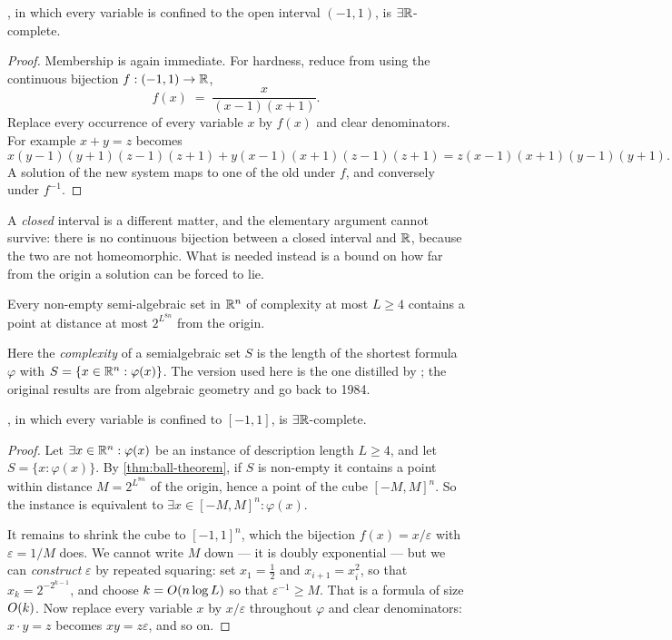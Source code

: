 \begin{lemma}\label{lem:bounded-etr}
, in which every variable is confined to the open interval
$(-1,1)$, is $\exists\mathbb{R}$-complete.
\end{lemma}

\begin{proof}
Membership is again immediate. For hardness, reduce from  using
the continuous bijection $f : (-1,1) \to \mathbb{R}$,
\[ f(x) \;=\; \frac{x}{(x-1)(x+1)}. \]
Replace every occurrence of every variable $x$ by $f(x)$ and clear
denominators. For example $x + y = z$ becomes
\[ x(y-1)(y+1)(z-1)(z+1) + y(x-1)(x+1)(z-1)(z+1)
   = z(x-1)(x+1)(y-1)(y+1). \]
A solution of the new system maps to one of the old under $f$, and conversely
under $f^{-1}$.
\end{proof}

A \emph{closed} interval is a different matter, and the elementary argument
cannot survive: there is no continuous bijection between a closed interval and
$\mathbb{R}$, because the two are not homeomorphic. What is needed instead is a bound on
how far from the origin a solution can be forced to lie.

\begin{theorem}\label{thm:ball-theorem}
Every non-empty semi-algebraic set in $\mathbb{R}^n$ of complexity at most $L \ge 4$
contains a
point at distance at most $2^{L^{8n}}$ from the origin.
\end{theorem}

Here the \emph{complexity} of a semialgebraic set $S$ is the length of the
shortest formula $\varphi$ with $S = \{x \in \mathbb{R}^n : \varphi(x)\}$. The version
used here is the one distilled by \citet{SchaeferStefankovic2017}; the original
results are from algebraic geometry and go back to 1984.

\begin{lemma}\label{lem:compact-etr}
, in which every variable is confined to $[-1,1]$, is
$\exists\mathbb{R}$-complete.
\end{lemma}

\begin{proof}
Let $\exists x \in \mathbb{R}^n : \varphi(x)$ be an  instance of
description length $L \ge 4$, and let $S = \{x : \varphi(x)\}$. By
\cref{thm:ball-theorem}, if $S$ is non-empty it contains a point within
distance $M = 2^{L^{8n}}$ of the origin, hence a point of the cube
$[-M,M]^n$. So the instance is equivalent to $\exists x \in [-M,M]^n :
\varphi(x)$.

It remains to shrink the cube to $[-1,1]^n$, which the bijection
$f(x) = x/\varepsilon$ with $\varepsilon = 1/M$ does. We cannot write $M$ down
--- it is doubly exponential --- but we can \emph{construct} $\varepsilon$ by
repeated squaring: set $x_1 = \tfrac12$ and $x_{i+1} = x_i^2$, so that
$x_k = 2^{-2^{k-1}}$, and choose $k = O\!\left(n \log L\right)$ so that
$\varepsilon^{-1} \ge M$. That is a formula of size $O\!\left(k\right)$. Now replace
every variable $x$ by $x/\varepsilon$ throughout $\varphi$ and clear
denominators: $x \cdot y = z$ becomes $xy = z\varepsilon$, and so on.
\end{proof}

